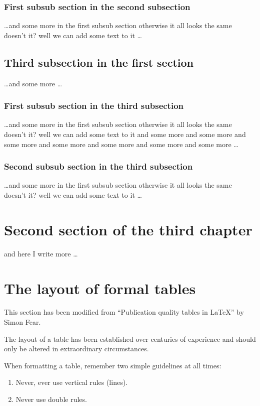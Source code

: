\documentclass[a4paper,12pt,times,print,index, custombib]{PhDThesisPSnPDF}\usepackage[]{graphicx}\usepackage[]{color}
\begin{document}
\subsubsection{First subsub section in the second subsection}
\dots and some more in the first subsub section otherwise it all looks the same
doesn't it? well we can add some text to it \dots

\subsection{Third subsection in the first section}
\dots and some more \dots

\subsubsection{First subsub section in the third subsection}
\dots and some more in the first subsub section otherwise it all looks the same
doesn't it? well we can add some text to it and some more and some more and
some more and some more and some more and some more and some more \dots

\subsubsection{Second subsub section in the third subsection}
\dots and some more in the first subsub section otherwise it all looks the same
doesn't it? well we can add some text to it \dots

\section{Second section of the third chapter}
and here I write more \dots

\section{The layout of formal tables}
This section has been modified from ``Publication quality tables in \LaTeX*''
 by Simon Fear.

The layout of a table has been established over centuries of experience and 
should only be altered in extraordinary circumstances. 

When formatting a table, remember two simple guidelines at all times:

\begin{enumerate}
  \item Never, ever use vertical rules (lines).
  \item Never use double rules.
\end{enumerate}
\end{document}
